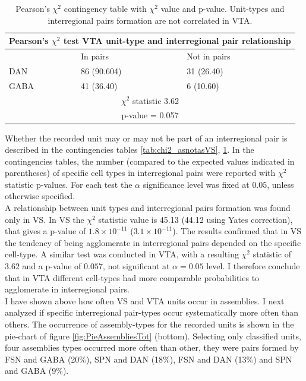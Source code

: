 \begin{table}[H]
\begin{tabular}{ |p{3cm}|p{3cm}|p{3cm}| }
 \hline
 \multicolumn{3}{|c|}{Pearson's $\chi^2$ test VTA unit-type and interregional pair relationship} \\
 \hline
 & In pairs & Not in pairs\\
 \hline
 DAN & 86 (90.604) & 31 (26.40) \\
 \hline
 GABA & 41 (36.40) & 6 (10.60)\\
 \hline
 \multicolumn{3}{|c|}{$\chi^2$ statistic  3.62}\\
 \multicolumn{3}{|c|}{p-value = 0.057}\\
 \hline
\end{tabular}
\caption{Pearson's $\chi^2$ contingency table with $\chi^2$ value and p-value. Unit-types and interregional pairs formation are not correlated in VTA.}
\label{tab:chi2_asnotasVTA}
\end{table}
Whether the recorded unit may or may not be part of an interregional pair is described  in the contingencies tables \ref{tab:chi2_asnotasVS}, \ref{tab:chi2_asnotasVTA}. In the contingencies tables, the number (compared to the expected values indicated in parentheses) of specific cell types in interregional pairs were reported with $\chi^2$ statistic p-values. For each test the $\alpha$ significance level was fixed at $0.05$, unless otherwise specified.\\A relationship between unit types and interregional pairs formation was found only in VS. In VS the $\chi^2$ statistic value is 45.13 (44.12 using Yates correction), that gives a p-value of $1.8\times10^{-11}$ ($3.1\times10^{-11}$). The results confirmed that in VS the tendency of being agglomerate in interregional pairs depended on the specific cell-type. A similar test was conducted in VTA, with a resulting $\chi^2$ statistic of $3.62$ and a p-value of $0.057$, not significant at $\alpha = 0.05$ level. I therefore conclude that in VTA different cell-types had more comparable probabilities to agglomerate in interregional pairs.\\I have shown above how often VS and VTA units occur in assemblies. I next analyzed if specific interregional pair-types occur systematically more often than others. The occurrence of assembly-types for the recorded units is shown in the pie-chart of figure \ref{fig:PieAssembliesTot} (bottom). Selecting only classified units, four assemblies types occurred more often than other, they were pairs formed by FSN and GABA (20$\%$), SPN and DAN (18$\%$), FSN and DAN (13$\%$) and SPN and GABA (9$\%$).
